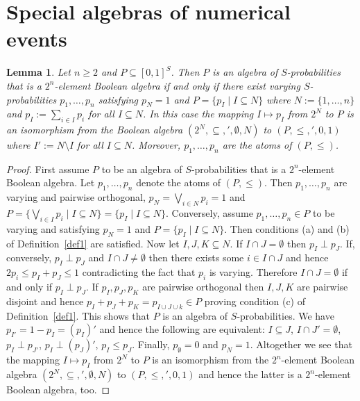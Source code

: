 \documentclass[12pt]{article}
\newtheorem{lemma}[theorem]{Lemma}
\begin{document}
\section{Special algebras of numerical events}

\begin{lemma}\label{lem1}
Let $n\ge2$ and $P\subseteq[0,1]^S$. Then $P$ is an algebra of $S$-probabilities that is a $2^n$-element Boolean algebra if and only if there exist varying $S$-probabilities $p_1,\ldots,p_n$ satisfying $p_N=1$ and $P=\{p_I\mid I\subseteq N\}$ where $N:=\{1,\ldots,n\}$ and $p_I:=\sum\limits_{i\in I}p_i$ for all $I\subseteq N$. In this case the mapping $I\mapsto p_I$ from $2^N$ to $P$ is an isomorphism from the Boolean algebra $(2^N,\subseteq,{}',\emptyset,N)$ to $(P,\le,{}',0,1)$ where $I':=N\setminus I$ for all $I\subseteq N$. Moreover, $p_1,\ldots,p_n$ are the atoms of $(P,\le)$.
\end{lemma}

\begin{proof}
First assume $P$ to be an algebra of $S$-probabilities that	is a $2^n$-element Boolean algebra. Let $p_1,\ldots,p_n$ denote the atoms of $(P,\le)$. Then $p_1,\ldots,p_n$ are varying and pairwise orthogonal, $p_N=\bigvee\limits_{i\in N}p_i=1$ and $P=\{\bigvee\limits_{i\in I}p_i\mid I\subseteq N\}=\{p_I\mid I\subseteq N\}$. Conversely, assume $p_1,\ldots,p_n\in P$ to be varying and satisfying $p_N=1$ and $P=\{p_I\mid I\subseteq N\}$. Then conditions (a) and (b) of Definition~\ref{def1} are satisfied. Now let $I,J,K\subseteq N$. If $I\cap J=\emptyset$ then $p_I\perp p_J$. If, conversely, $p_I\perp p_J$ and $I\cap J\ne\emptyset$ then there exists some $i\in I\cap J$ and hence $2p_i\le p_I+p_J\le1$ contradicting the fact that $p_i$ is varying. Therefore $I\cap J=\emptyset$ if and only if $p_I\perp p_J$. If $p_I,p_J,p_K$ are pairwise orthogonal then $I,J,K$ are pairwise disjoint and hence $p_I+p_J+p_K=p_{I\cup J\cup k}\in P$ proving condition (c) of Definition~\ref{def1}. This shows that $P$ is an algebra of $S$-probabilities. We have $p_{I'}=1-p_I=(p_I)'$ and hence the following are equivalent: $I\subseteq J$, $I\cap J'=\emptyset$, $p_I\perp p_{J'}$, $p_I\perp(p_J)'$, $p_I\le p_J$. Finally, $p_\emptyset=0$ and $p_N=1$. Altogether we see that the mapping $I\mapsto p_I$ from $2^N$ to $P$ is an isomorphism from the $2^n$-element Boolean algebra $(2^N,\subseteq,{}',\emptyset,N)$ to $(P,\le,{}',0,1)$ and hence the latter is a $2^n$-element Boolean algebra, too.
\end{proof}
\end{document}
